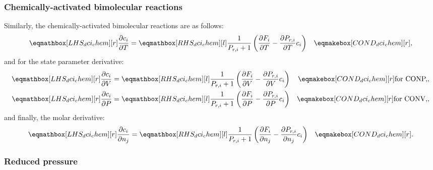 \documentclass[12pt,number,sort&compress]{elsarticle}
\begin{document}
\subsubsection{Chemically-activated bimolecular reactions}
\label{s:dchem}

Similarly, the chemically-activated bimolecular reactions are as follows:
\begin{align}
 \label{e:dci_chem_dt}
 \lhs{dci_chem}{\frac{\partial c_i }{\partial T }} &= \rhs{dci_chem}{\frac{1}{P_{r, i} + 1} \left(\frac{\partial F_{i} }{\partial T } - \frac{\partial P_{r, i} }{\partial T } c_{i}\right)} & \cond{dci_chem}{,} \\
 \end{align}
and for the state parameter derivative:
\begin{subequations}
 \label{e:dci_chem_de}
 \begin{align}
  \lhs{dci_chem}{\frac{\partial c_i }{\partial V }} &= \rhs{dci_chem}{\frac{1}{P_{r, i} + 1} \left(\frac{\partial F_{i} }{\partial V } - \frac{\partial P_{r, i} }{\partial V } c_{i}\right)} & \cond{dci_chem}{\dconp/,} \\
  \lhs{dci_chem}{\frac{\partial c_i }{\partial P }} &= \rhs{dci_chem}{\frac{1}{P_{r, i} + 1} \left(\frac{\partial F_{i} }{\partial P } - \frac{\partial P_{r, i} }{\partial P } c_{i}\right)} & \cond{dci_chem}{\dconv/,}
 \end{align}
\end{subequations}
and finally, the molar derivative:
\begin{align}
 \label{e:dci_chem_dnj}
 \lhs{dci_chem}{\frac{\partial c_i }{\partial n_j }} &= \rhs{dci_chem}{\frac{1}{P_{r, i} + 1} \left(\frac{\partial F_{i} }{\partial n_j } - \frac{\partial P_{r, i} }{\partial n_j } c_{i}\right)} & \cond{dci_chem}{.}
\end{align}


\subsubsection{Reduced pressure}
\label{s:dpr}
\end{document}
